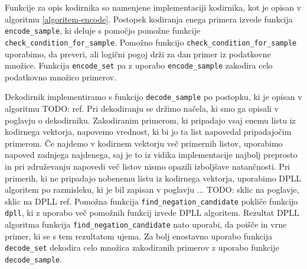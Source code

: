\documentclass[12pt,a4paper]{article}
\begin{document}




Funkcije za opis kodirnika so namenjene implementaciji kodirnika, kot je opisan v algoritmu \ref{algoritem-encode}.
Postopek kodiranja enega primera izvede funkcija \texttt{encode\_sample}, ki deluje s pomočjo pomožne funkcije \texttt{check\_condition\_for\_sample}.
Pomožno funkcijo \texttt{check\_condition\_for\_sample} uporabimo, da preveri, ali logični pogoj drži za dan primer iz podatkovne množice.
Funkcija \texttt{encode\_set} pa z uporabo \texttt{encode\_sample} zakodira celo podatkovno množico primerov.



Dekodirnik implementiramo s funkcijo \texttt{decode\_sample} po postopku, ki je opisan v algoritmu TODO: ref.
Pri dekodiranju se držimo načela, ki smo ga opisali v poglavju o dekodirniku.
Zakodiranim primerom, ki pripadajo vsaj enemu listu iz kodirnega vektorja, napovemo vrednost, ki bi jo ta list napovedal pripadajočim primerom.
Če najdemo v kodirnem vektorju več primernih listov, uporabimo napoved zadnjega najdenega, 
saj je to iz vidika implementacije najbolj preprosto in pri združevanju napovedi več listov nismo opazili izboljšave natančnosti.
Pri primerih, ki ne pripadajo nobenemu listu iz kodirnega vektorja, uporabimo DPLL algoritem po razmisleku, ki je bil zapisan v poglavju ... TODO: sklic na poglavje, sklic na DPLL ref.
Pomožna funkcija \texttt{find\_negation\_candidate} pokliče funkcijo \texttt{dpll}, ki z uporabo več pomožnih funkcij izvede DPLL algoritem. %
Rezultat DPLL algoritma funkcija \texttt{find\_negation\_candidate} nato uporabi, da poišče in vrne primer, ki se s tem rezultatom ujema.
Za bolj enostavno uporabo funkcija \texttt{decode\_set} dekodira celo množica zakodiranih primerov z uporabo funkcije \texttt{decode\_sample}.
\end{document}
